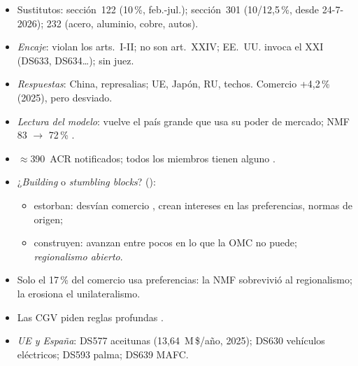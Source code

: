 \documentclass{article}
\begin{document}
\begin{columnas}
\begin{itemize}
\item Sustitutos: sección~122 (10\,\%, feb.-jul.); sección~301 (10/12,5\,\%, desde 24-7-2026); 232 (acero, aluminio, cobre, autos).
\item \emph{Encaje}: violan los arts.~I-II; no son art.~XXIV; EE.~UU. invoca el XXI (DS633, DS634\ldots); sin juez.
\item \emph{Respuestas}: China, represalias; UE, Japón, RU, techos. Comercio +4,2\,\% (2025), pero desviado.
\item \emph{Lectura del modelo}: vuelve el país grande que usa su poder de mercado; NMF 83 $\to$ 72\,\% .
\end{itemize}
\begin{itemize}
\item $\approx$390~ACR notificados; todos los miembros tienen alguno .
\item ¿\emph{Building} o \emph{stumbling blocks}? ():
  \begin{itemize}
  \item estorban: desvían comercio , crean intereses en las preferencias, normas de origen;
  \item construyen: avanzan entre pocos en lo que la OMC no puede; \emph{regionalismo abierto}.
  \end{itemize}
\item Solo el 17\,\% del comercio usa preferencias: la NMF sobrevivió al regionalismo; la erosiona el unilateralismo.
\item Las CGV piden reglas profundas .
\item \emph{UE y España}: DS577 aceitunas (13,64~M\,\$/año, 2025); DS630 vehículos eléctricos; DS593 palma; DS639 MAFC.
\end{itemize}


\end{columnas}
\end{document}
